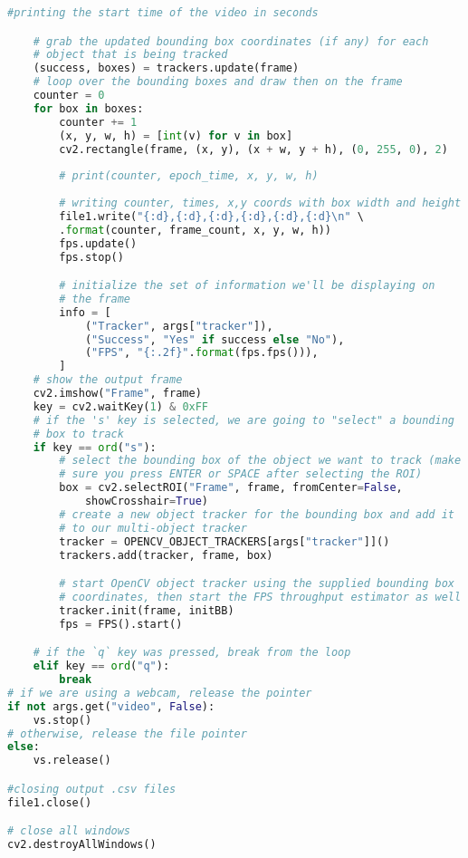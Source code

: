 \documentclass[11pt]{article}
\begin{document}
\begin{footnotesize}
\begin{lstlisting}[language=Python,showstringspaces=false]
	#printing the start time of the video in seconds

	# grab the updated bounding box coordinates (if any) for each
	# object that is being tracked
	(success, boxes) = trackers.update(frame)
	# loop over the bounding boxes and draw then on the frame
	counter = 0
	for box in boxes:
		counter += 1
		(x, y, w, h) = [int(v) for v in box]
		cv2.rectangle(frame, (x, y), (x + w, y + h), (0, 255, 0), 2)
		
		# print(counter, epoch_time, x, y, w, h)
	
		# writing counter, times, x,y coords with box width and height to .csv file
		file1.write("{:d},{:d},{:d},{:d},{:d},{:d}\n" \ 
		.format(counter, frame_count, x, y, w, h))
		fps.update()
		fps.stop()

		# initialize the set of information we'll be displaying on
		# the frame
		info = [
			("Tracker", args["tracker"]),
			("Success", "Yes" if success else "No"),
			("FPS", "{:.2f}".format(fps.fps())),
		]
	# show the output frame
	cv2.imshow("Frame", frame)
	key = cv2.waitKey(1) & 0xFF
	# if the 's' key is selected, we are going to "select" a bounding
	# box to track
	if key == ord("s"):
		# select the bounding box of the object we want to track (make
		# sure you press ENTER or SPACE after selecting the ROI)
		box = cv2.selectROI("Frame", frame, fromCenter=False,
			showCrosshair=True)
		# create a new object tracker for the bounding box and add it
		# to our multi-object tracker
		tracker = OPENCV_OBJECT_TRACKERS[args["tracker"]]()
		trackers.add(tracker, frame, box)

		# start OpenCV object tracker using the supplied bounding box
		# coordinates, then start the FPS throughput estimator as well
		tracker.init(frame, initBB)
		fps = FPS().start()

	# if the `q` key was pressed, break from the loop
	elif key == ord("q"):
		break
# if we are using a webcam, release the pointer
if not args.get("video", False):
	vs.stop()
# otherwise, release the file pointer
else:
	vs.release()

#closing output .csv files
file1.close()

# close all windows
cv2.destroyAllWindows()
\end{lstlisting}
\end{footnotesize}
\end{document}
